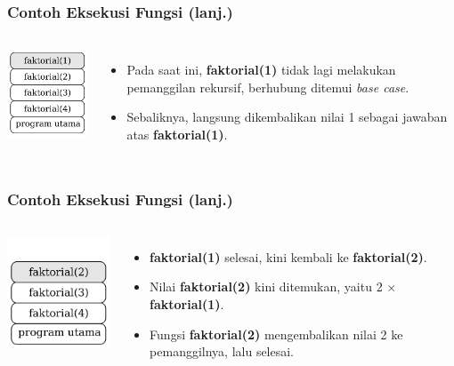 \begin{frame}
\frametitle{Contoh Eksekusi Fungsi (lanj.)}
\begin{columns}
    \centering
    \includegraphics[width=4cm]{asset/rekursi-5.pdf}
    \begin{itemize}
      \item Pada saat ini, \textbf{faktorial(1)} tidak lagi melakukan pemanggilan rekursif, berhubung ditemui \textit{base case}.
      \item Sebaliknya, langsung dikembalikan nilai 1 sebagai jawaban atas \textbf{faktorial(1)}.
    \end{itemize}
  \end{columns} 
\end{frame}

\begin{frame}
\frametitle{Contoh Eksekusi Fungsi (lanj.)}
\begin{columns}
    \centering
    \includegraphics[width=4cm]{asset/rekursi-4.pdf}
    \begin{itemize}
      \item \textbf{faktorial(1)} selesai, kini kembali ke \textbf{faktorial(2)}.
      \item Nilai \textbf{faktorial(2)} kini ditemukan, yaitu 2 $\times$ \textbf{faktorial(1)}.
      \item Fungsi \textbf{faktorial(2)} mengembalikan nilai 2 ke pemanggilnya, lalu selesai.
    \end{itemize}
  \end{columns} 
\end{frame}


